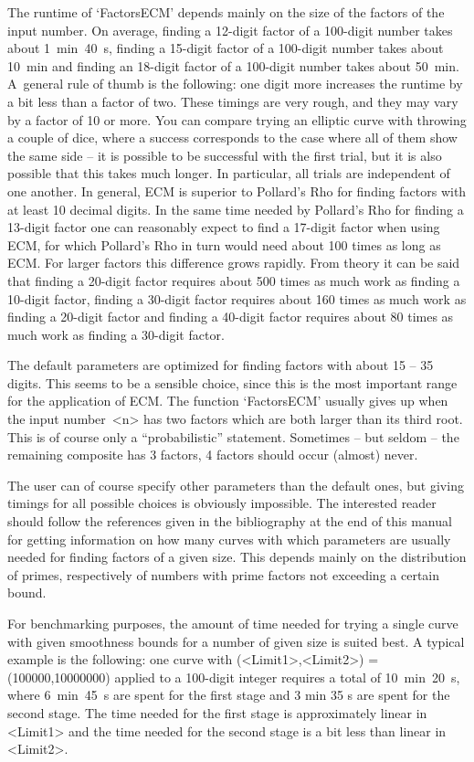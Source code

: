 The runtime of `FactorsECM' depends mainly on the size of the factors
of the input number.
On average, finding a 12-digit factor of a 100-digit number
takes about 1~min~40~s, finding a 15-digit factor of a 100-digit
number takes about 10~min and finding an 18-digit factor of a 100-digit
number takes about 50~min.
A~general rule of thumb is the following: one digit more increases the
runtime by a bit less than a factor of two.
These timings are very rough, and they may vary by a factor of 10 or more.
You can compare trying an elliptic curve with throwing a couple of dice,
where a success corresponds to the case where all of them show the same
side -- it is possible to be successful with the first trial, but it is
also possible that this takes much longer. In particular, all trials are
independent of one another.
In general, ECM is superior to Pollard's Rho for finding factors with at
least 10 decimal digits. In the same time needed by Pollard's Rho
for finding a 13-digit factor one can reasonably expect to find a
17-digit factor when using ECM, for which Pollard's Rho in turn would
need  about 100 times as long as ECM.
For larger factors this difference grows rapidly.
From theory it can be said that finding a 20-digit factor requires
about 500 times as much work as finding a 10-digit factor,
finding a 30-digit factor requires about 160 times as much work as
finding a 20-digit factor and finding a 40-digit factor requires
about 80 times as much work as finding a 30-digit factor.

The default parameters are optimized for finding factors with about
15 -- 35 digits. This seems to be a sensible choice, since this is the
most important range for the application of ECM. The function
`FactorsECM' usually gives up when the input number~<n> has two factors
which are both larger than its third root. This is of course only a
``probabilistic'' statement. Sometimes -- but seldom -- the remaining
composite has 3 factors, 4 factors should occur (almost) never.

The user can of course specify other parameters than the default ones,
but giving timings for all possible choices is obviously impossible.
The interested reader should follow the references given in the
bibliography at the end of this manual for getting information on how
many curves with which parameters are usually needed for finding
factors of a given size. This depends mainly on the distribution of
primes, respectively of numbers with prime factors not exceeding a
certain bound.

For benchmarking purposes, the amount of time needed for trying
a single curve with given smoothness bounds for a number of given size
is suited best.
A typical example is the following: one curve with (<Limit1>,<Limit2>) =
(100000,10000000) applied to a 100-digit integer requires a total of
10~min~20~s, where 6~min~45~s are spent for the first stage
and 3 min 35 s are spent for the second stage.
The time needed for the first stage is approximately linear in <Limit1>
and the time needed for the second stage is a bit less than linear
in <Limit2>.

